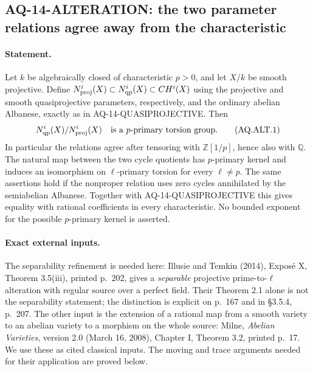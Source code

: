\subsection{AQ-14-ALTERATION: the two parameter relations agree away from the characteristic}
\paragraph{Statement.}
Let $k$ be algebraically closed of characteristic $p>0$,
and let $X/k$ be smooth projective.  Define
$N^i_{\rm proj}(X)\subset N^i_{\rm qp}(X)\subset CH^i(X)$
using the projective and smooth quasiprojective parameters,
respectively, and the ordinary abelian Albanese, exactly as
in AQ-14-QUASIPROJECTIVE.  Then
\[
 N^i_{\rm qp}(X)/N^i_{\rm proj}(X)
 \quad\hbox{is a $p$-primary torsion group.}               \tag{AQ.ALT.1}
\]
In particular the relations agree after tensoring with
$\mathbb Z[1/p]$, hence also with $\mathbb Q$.
The natural map between the two cycle quotients has
$p$-primary kernel and induces an isomorphism on
$\ell$-primary torsion for every $\ell\ne p$.
The same assertions hold if the nonproper relation uses
zero cycles annihilated by the semiabelian Albanese.
Together with AQ-14-QUASIPROJECTIVE this gives equality
with rational coefficients in every characteristic.
No bounded exponent for the possible $p$-primary kernel
is asserted.

\paragraph{Exact external inputs.}
The separability refinement is needed here: Illusie and
Temkin (2014), Expos\'e X, Theorem 3.5(iii), printed p.~202,
gives a \emph{separable} projective prime-to-$\ell$ alteration
with regular source over a perfect field.  Their
Theorem 2.1 alone is not the separability statement;
the distinction is explicit on p.~167 and in \S3.5.4,
p.~207.  The other input is the extension of a rational
map from a smooth variety to an abelian variety to a
morphism on the whole source: Milne, \emph{Abelian
Varieties}, version 2.0 (March 16, 2008), Chapter I,
Theorem 3.2, printed p.~17.  We use these as cited
classical inputs.  The moving and trace arguments
needed for their application are proved below.


